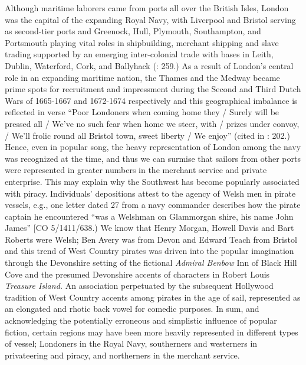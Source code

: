 
Although maritime laborers came from ports all over the British Isles, London was the capital of the expanding Royal Navy, with Liverpool and Bristol serving as second-tier ports and Greenock, Hull, Plymouth, Southampton, and Portsmouth playing vital roles in shipbuilding, merchant shipping and slave trading supported by an emerging inter-colonial trade with bases in Leith, Dublin, Waterford, Cork, and Ballyhack (\citealt{Jarvis2010}: 259.) As a result of London’s central role in an expanding maritime nation, the Thames and the Medway became prime spots for recruitment and impressment during the Second and Third Dutch Wars of 1665-1667 and 1672-1674 respectively \citep[201,]{Earle1998} and this geographical imbalance is reflected in verse “Poor Londoners when coming home they / Surely will be pressed all / We’ve no such fear when home we steer, with / prizes under convoy, / We’ll frolic round all Bristol town, sweet liberty / We enjoy” (cited in \citealt{Earle1998}: 202.) Hence, even in popular song, the heavy representation of London among the navy was recognized at the time, and thus we can surmise that sailors from other ports were represented in greater numbers in the merchant service and private enterprise. This may explain why the Southwest has become popularly associated with piracy. Individuals’ depositions attest to the agency of Welsh men in pirate vessels, e.g., one letter dated 27 \citealt{July1699} from a navy commander describes how the pirate captain he encountered “was a Welshman on Glammorgan shire, his name John James” [CO 5/1411/638.) We know that Henry Morgan, Howell Davis and Bart Roberts were Welsh; Ben Avery was from Devon and Edward Teach from Bristol \citep[328,]{Bicheno2012} and this trend of West Country pirates was driven into the popular imagination through the Devonshire setting of the fictional \textit{Admiral Benbow} Inn of Black Hill Cove and the presumed Devonshire accents of characters in Robert Louis  \textit{Treasure Island.} An association perpetuated by the subsequent Hollywood tradition of West Country accents among pirates in the age of sail, represented as an elongated and rhotic back vowel for comedic purposes. In sum, and acknowledging the potentially erroneous and simplistic influence of popular fiction, certain regions may have been more heavily represented in different types of vessel; Londoners in the Royal Navy, southerners and westerners in privateering and piracy, and northerners in the merchant service. 

